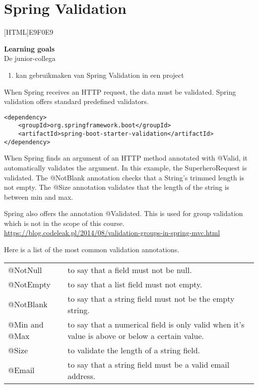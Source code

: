 \chapter{Spring Validation}
    
[HTML]{E9F0E9}{\parbox{\textwidth}{%
\noindent \textbf{Learning goals}\\
De junior-collega
\begin{enumerate}[nolistsep]
\item kan gebruikmaken van Spring Validation in een project
\end{enumerate}}}


When Spring receives an HTTP request, the data must be validated. 
Spring validation offers  standard predefined validators.  

\begin{lstlisting}
<dependency>
	<groupId>org.springframework.boot</groupId>
	<artifactId>spring-boot-starter-validation</artifactId>
</dependency>
\end{lstlisting}

When Spring finds an argument of an HTTP method annotated with @Valid, it automatically validates the argument.  In this example, the SuperheroRequest is validated. 
The @NotBlank annotation checks that a String's trimmed length is not empty.
The @Size annotation validates that the length of the string is between min and max.

Spring also offers the annotation @Validated. This is used for group validation which is not in the scope of this course. \url{https://blog.codeleak.pl/2014/08/validation-groups-in-spring-mvc.html}

Here is a list of the most common validation annotations.

\begin{tabularx}{\textwidth}{|l|X|}
\hline
@NotNull & to say that a field must not be null. \\
@NotEmpty & to say that a list field must not empty. \\
@NotBlank & to say that a string field must not be the empty string. \\
@Min and @Max & to say that a numerical field is only valid when it’s value is above or below a certain value.\\
@Size & to validate the length of a string field. \\
@Email & to say that a string field must be a valid email address.\\
\hline
\end{tabularx}

